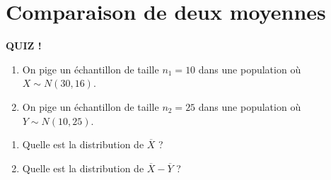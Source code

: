 \documentclass{BeamerTemplate}
\begin{document}

\section{Comparaison de deux moyennes}


\begin{frame}[t]%

\centerline{\LARGE \bf \alert{QUIZ !}}
\begin{enumerate}[$\bullet$]\itemsep 2mm
\item On pige un échantillon de taille $n_1=10$ dans une population où $X\sim N(30, 16)$.
\item On pige un échantillon de taille $n_2=25$ dans une population où $Y\sim N(10, 25)$.
\end{enumerate}

\vspace{6mm}

\begin{enumerate}\itemsep 5mm
\item Quelle est la distribution de $\overline X$ ?
\item Quelle est la distribution de $\overline X - \overline Y $ ?
\end{enumerate}
\vspace{1cm}

\end{frame}
\end{document}
